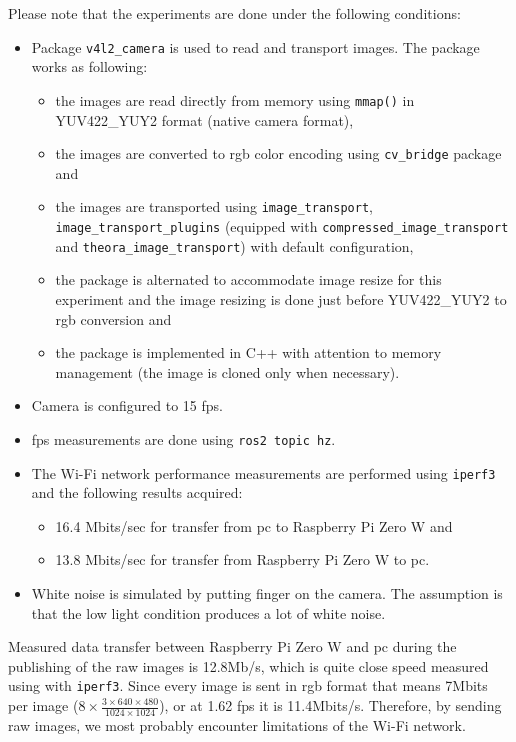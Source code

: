 Please note that the experiments are done under the following conditions:
\begin{itemize}
    \item Package \texttt{v4l2\_camera} is used to read and transport images. The package works as following:
        \begin{itemize}
            \item the images are read directly from memory using \texttt{mmap()} in YUV422\_YUY2 format (native camera format),
            \item the images are converted to \ac{rgb} color encoding using \texttt{cv\_bridge} package and
            \item the images are transported using \texttt{image\_transport}, \texttt{image\_transport\_plugins} (equipped with \texttt{compressed\_image\_transport} and \texttt{theora\_image\_transport}) with default configuration,
            \item the package is alternated to accommodate image resize for this experiment and the image resizing is done just before YUV422\_YUY2 to \ac{rgb} conversion and
            \item the package is implemented in C++ with attention to memory management (the image is cloned only when necessary).
        \end{itemize}
    \item Camera is configured to 15 \ac{fps}.
    \item \ac{fps} measurements are done using \texttt{ros2 topic hz}.
    \item The Wi-Fi network performance measurements are performed using \texttt{iperf3} and the following results acquired:
        \begin{itemize}
            \item 16.4 Mbits/sec for transfer from \ac{pc} to Raspberry Pi Zero W and
            \item 13.8 Mbits/sec for transfer from Raspberry Pi Zero W to \ac{pc}.
        \end{itemize}
    \item White noise is simulated by putting finger on the camera.
    The assumption is that the low light condition produces a lot of white noise. 
\end{itemize}

Measured data transfer between Raspberry Pi Zero W and \ac{pc} during the publishing of the raw images is 12.8Mb/s, which is quite close speed measured using with \texttt{iperf3}.
Since every image is sent in \ac{rgb} format that means 7Mbits per image ($ 8 \times \frac{ 3 \times 640 \times 480 }{1024 \times 1024}$), or at 1.62 \ac{fps} it is 11.4Mbits/s.
Therefore, by sending raw images, we most probably encounter limitations of the Wi-Fi network.

